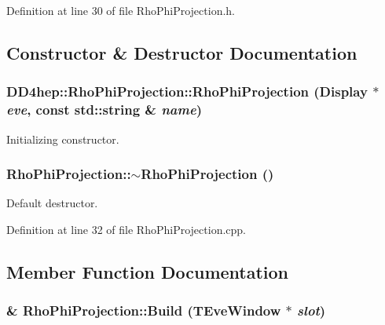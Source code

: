 Definition at line 30 of file RhoPhiProjection.h.

\subsection{Constructor \& Destructor Documentation}
\hypertarget{class_d_d4hep_1_1_rho_phi_projection_abe10facbc4c46e43a3854efada4c99ad}{
\subsubsection[{RhoPhiProjection}]{\setlength{\rightskip}{0pt plus 5cm}DD4hep::RhoPhiProjection::RhoPhiProjection ({\bf Display} $\ast$ {\em eve}, \/  const std::string \& {\em name})}}
\label{class_d_d4hep_1_1_rho_phi_projection_abe10facbc4c46e43a3854efada4c99ad}


Initializing constructor. \hypertarget{class_d_d4hep_1_1_rho_phi_projection_a9dc8283aa69ce065236b29de09905b54}{
\subsubsection[{$\sim$RhoPhiProjection}]{\setlength{\rightskip}{0pt plus 5cm}RhoPhiProjection::$\sim$RhoPhiProjection ()}}
\label{class_d_d4hep_1_1_rho_phi_projection_a9dc8283aa69ce065236b29de09905b54}


Default destructor. 

Definition at line 32 of file RhoPhiProjection.cpp.

\subsection{Member Function Documentation}
\hypertarget{class_d_d4hep_1_1_rho_phi_projection_a6a8d8e5c6a15d559da719c23eb8d7b8c}{
\subsubsection[{Build}]{ \& RhoPhiProjection::Build (TEveWindow $\ast$ {\em slot})}}
\label{class_d_d4hep_1_1_rho_phi_projection_a6a8d8e5c6a15d559da719c23eb8d7b8c}


